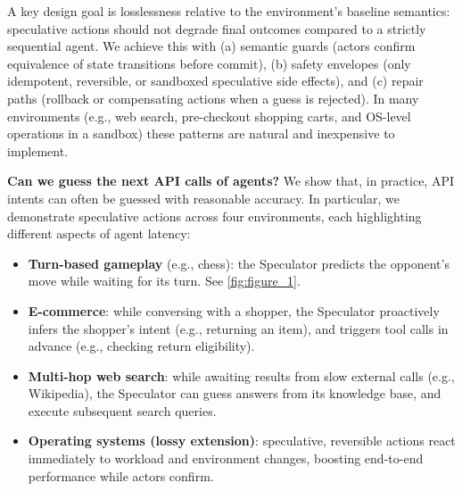 \documentclass{article} %
\theoremstyle{plain} %
\theoremstyle{definition} %
\theoremstyle{remark} %
\begin{document}
A key design goal is losslessness relative to the environment’s baseline semantics: speculative actions should not degrade final outcomes compared to a strictly sequential agent.
We achieve this with (a) semantic guards (actors confirm equivalence of state transitions before commit), (b) safety envelopes (only idempotent, reversible, or sandboxed speculative side effects), and (c) repair paths (rollback or compensating actions when a guess is rejected).
In many environments (e.g., web search, pre-checkout shopping carts, and OS-level operations in a sandbox) these patterns are natural and inexpensive to implement.


\textbf{Can we guess the next API calls of agents?} We show that, in practice, API intents can often be guessed with reasonable accuracy. In particular, we demonstrate speculative actions across four environments, each highlighting different aspects of agent latency:
\begin{itemize}[leftmargin=*]
    \item \textbf{Turn-based gameplay} (e.g., chess): the Speculator predicts the opponent's move while waiting for its turn.
See \cref{fig:figure_1}.
    \item \textbf{E-commerce}: while conversing with a shopper, the Speculator proactively infers the shopper's intent (e.g., returning an item), and triggers tool calls in advance (e.g., checking return eligibility).
    \item \textbf{Multi-hop web search}: while awaiting results from slow external calls (e.g., Wikipedia), the Speculator can guess answers from its knowledge base, and execute subsequent search queries.
 
    \item \textbf{Operating systems (lossy extension)}: speculative, reversible actions react immediately to workload and environment changes, boosting end-to-end performance while actors confirm.
\end{itemize}

\end{document}
